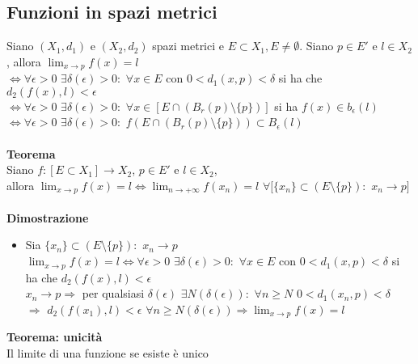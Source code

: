 \documentclass{article}
\begin{document}
\subsection{Funzioni in spazi metrici}
Siano $(X_1,d_1)$ e $(X_2,d_2)$ spazi metrici e $E\subset X_1, E\neq\emptyset$. Siano $p\in E'$ e $l\in X_2$, allora $\lim_{x\rightarrow p}f(x)=l$\\
$\Leftrightarrow\forall\epsilon>0$ $\exists\delta(\epsilon)>0:$ $\forall x\in E$ con $0<d_1(x,p)<\delta$ si ha che $d_2(f(x),l)<\epsilon$\\
$\Leftrightarrow\forall\epsilon>0$ $\exists\delta(\epsilon)>0:$ $\forall x\in [E\cap(B_r(p)\setminus\{p\})]$ si ha $f(x)\in b_\epsilon(l)$\\
$\Leftrightarrow\forall\epsilon>0$ $\exists\delta(\epsilon)>0:$ $f(E\cap(B_r(p)\setminus\{p\}))\subset B_\epsilon(l)$\\\\
\textbf{Teorema}\\
Siano $f:[E\subset X_1]\rightarrow X_2$, $p\in E'$ e $l\in X_2$,\\
allora $\lim_{x\rightarrow p}f(x)=l\Leftrightarrow\lim_{n\rightarrow+\infty}f(x_n)=l$ $\forall[\{x_n\}\subset (E\setminus\{p\}):$ $x_n\rightarrow p]$\\\\
\textbf{Dimostrazione}
\begin{itemize}
    \item Sia $\{x_n\}\subset (E\setminus\{p\}):$ $x_n\rightarrow p$\\
    $\lim_{x\rightarrow p}f(x)=l\Leftrightarrow\forall\epsilon>0$ $\exists\delta(\epsilon)>0:$ $\forall x\in E$ con $0<d_1(x,p)<\delta$ si ha che $d_2(f(x),l)<\epsilon$\\
    $x_n\rightarrow p\Rightarrow$ per qualsiasi $\delta(\epsilon)$ $\exists N(\delta(\epsilon)):$ $\forall n\geq N$ $0<d_1(x_n,p)<\delta$\\
    $\Rightarrow$ $d_2(f(x_1),l)<\epsilon$ $\forall n\geq N(\delta(\epsilon))\Rightarrow\lim_{x\rightarrow p}f(x)=l$
\end{itemize}
\textbf{Teorema: unicità}\\
Il limite di una funzione se esiste è unico
\end{document}

